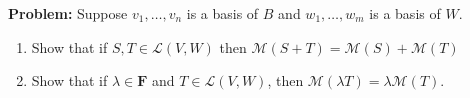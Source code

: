 \documentclass[10pt]{article}
\newcommand{\F}{\mathbf F}
\newenvironment{problem}{\textbf{Problem:}}{}
\begin{document}
	\begin{problem}
		Suppose \( v_1, \dots, v_n \) is a basis of \( B \) and \( w_1, \dots, w_m \) is a basis of \( W \). 
		\begin{enumerate}[label=\alph*)]
			\item Show that if \( S, T \in \mathcal L(V, W) \) then 
				\( \mathcal M(S + T) = \mathcal M(S) + \mathcal M(T) \) 
			\item Show that if \( \lambda \in \F \) and \( T \in \mathcal L(V, W) \), then \( \mathcal M(\lambda T)
				= \lambda \mathcal M(T)\). 
		\end{enumerate}
	\end{problem}
\end{document}
